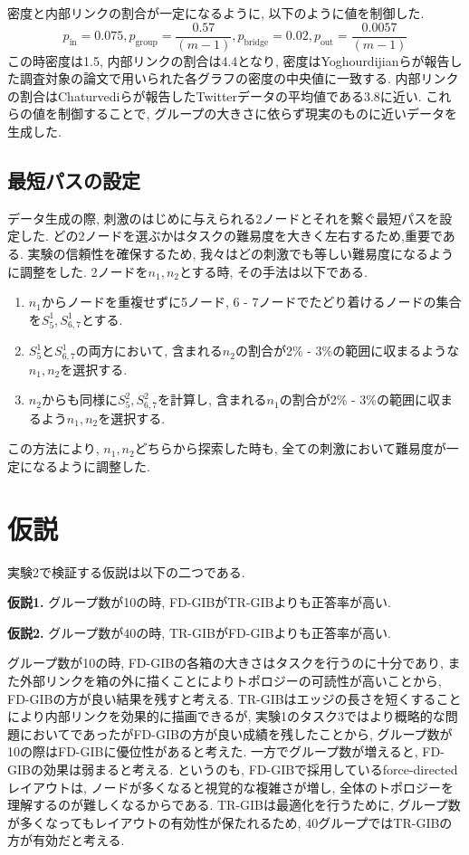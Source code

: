\documentclass{kuee}
\begin{document}
密度と内部リンクの割合が一定になるように, 以下のように値を制御した.
\[
  p_{\text{in}} = 0.075, p_{\text{group}} = \frac{0.57}{(m-1)}, p_{\text{bridge}} = 0.02, p_{\text{out}} = \frac{0.0057}{(m-1)}
\]
この時密度は1.5, 内部リンクの割合は4.4となり, 密度はYoghourdijianら\cite{yoghourdjian2018exploring}が報告した調査対象の論文で用いられた各グラフの密度の中央値に一致する.
内部リンクの割合はChaturvediら\cite{chaturvedi2014group}が報告したTwitterデータの平均値である3.8に近い.
これらの値を制御することで, グループの大きさに依らず現実のものに近いデータを生成した.

\subsection{最短パスの設定}
\label{subsec:shortest_path}
データ生成の際, 刺激のはじめに与えられる2ノードとそれを繋ぐ最短パスを設定した.
どの2ノードを選ぶかはタスクの難易度を大きく左右するため,重要である.
実験の信頼性を確保するため, 我々はどの刺激でも等しい難易度になるように調整をした.
2ノードを$n_1, n_2$とする時, その手法は以下である.
\begin{enumerate}
  \item $n_1$からノードを重複せずに5ノード, 6 - 7ノードでたどり着けるノードの集合を$S_5^1, S_{6, 7}^1$とする.
  \item $S_5^1$と$S_{6, 7}^1$の両方において, 含まれる$n_2$の割合が2\% - 3\%の範囲に収まるような$n_1, n_2$を選択する.
  \item $n_2$からも同様に$S_5^2, S_{6, 7}^2$を計算し, 含まれる$n_1$の割合が2\% - 3\%の範囲に収まるよう$n_1, n_2$を選択する.
\end{enumerate}
この方法により, $n_1, n_2$どちらから探索した時も, 全ての刺激において難易度が一定になるように調整した.


\section{仮説}
\label{subsec:hypothesis-ex2}
実験2で検証する仮説は以下の二つである.
\begin{description}
  \item{\bf 仮説1.} グループ数が10の時, FD-GIBがTR-GIBよりも正答率が高い.
  \item{\bf 仮説2.} グループ数が40の時, TR-GIBがFD-GIBよりも正答率が高い.
\end{description}
グループ数が10の時, FD-GIBの各箱の大きさはタスクを行うのに十分であり, また外部リンクを箱の外に描くことによりトポロジーの可読性が高いことから, FD-GIBの方が良い結果を残すと考える.
TR-GIBはエッジの長さを短くすることにより内部リンクを効果的に描画できるが, 実験1のタスク3ではより概略的な問題においてであったがFD-GIBの方が良い成績を残したことから, グループ数が10の際はFD-GIBに優位性があると考えた.
一方でグループ数が増えると, FD-GIBの効果は弱まると考える.
というのも, FD-GIBで採用しているforce-directedレイアウトは, ノードが多くなると視覚的な複雑さが増し, 全体のトポロジーを理解するのが難しくなるからである.
TR-GIBは最適化を行うために, グループ数が多くなってもレイアウトの有効性が保たれるため, 40グループではTR-GIBの方が有効だと考える.
\end{document}
